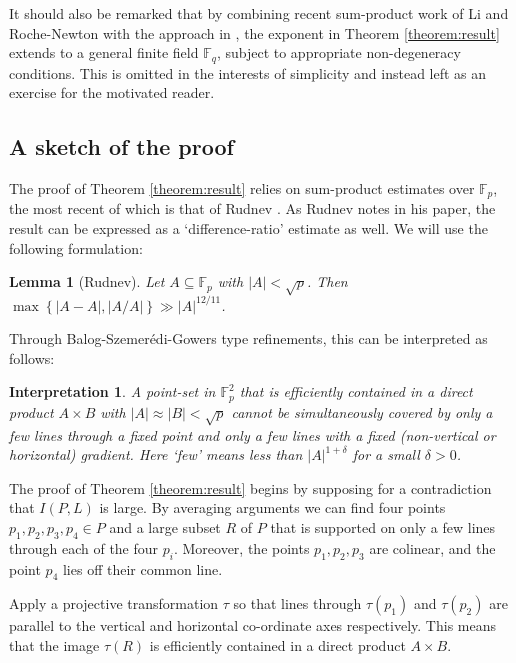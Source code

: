 \documentclass[12pt]{article}
\newtheorem{lemma}[theorem]{Lemma}
\newtheorem*{interpretation}{Interpretation}
\begin{document}
It should also be remarked that by combining recent sum-product work of Li and Roche-Newton \cite{LRN} with the approach in \cite{me1}, the exponent in Theorem \ref{theorem:result} extends to a general finite field $\mathbb{F}_q$, subject to appropriate non-degeneracy conditions. This is omitted in the interests of simplicity and instead left as an exercise for the motivated reader.

\subsection*{A sketch of the proof}

The proof of Theorem \ref{theorem:result} relies on sum-product estimates over $\mathbb{F}_p$, the most recent of which is that of Rudnev \cite{rudnev}. As Rudnev notes in his paper, the result can be expressed as a `difference-ratio' estimate as well. We will use the following formulation:

\begin{lemma}[Rudnev]\label{theorem:rudnev}
Let $A \subseteq \mathbb{F}_p$ with $|A|<\sqrt{p}$. Then $\max\left\{|A-A|,|A/ A|\right\}\gg |A|^{12/11}$.
\end{lemma}

Through Balog-Szemer\'edi-Gowers type refinements, this can be interpreted as follows:

\begin{interpretation}
A point-set in $\mathbb{F}_p^2$ that is efficiently contained in a direct product $A \times B$ with $|A|\approx |B|<\sqrt{p}$  cannot be simultaneously covered by only a few lines through a fixed point and only a few lines with a fixed (non-vertical or horizontal) gradient. Here `few' means less than $|A|^{1+\delta}$ for a small $\delta>0$. 
\end{interpretation}

The proof of Theorem \ref{theorem:result} begins by supposing for a contradiction that $I(P,L)$ is large. By averaging arguments we can find four points $p_1,p_2,p_3,p_4 \in P$ and a large subset $R$ of $P$ that is supported on only a few lines through each of the four $p_i$. Moreover, the points $p_1,p_2,p_3$ are colinear, and the point $p_4$ lies off their common line.

Apply a projective transformation $\tau$ so that lines through $\tau(p_1)$ and $\tau(p_2)$ are parallel to the vertical and horizontal co-ordinate axes respectively. This means that the image $\tau(R)$ is efficiently contained in a direct product $A \times B$. 
\end{document}
